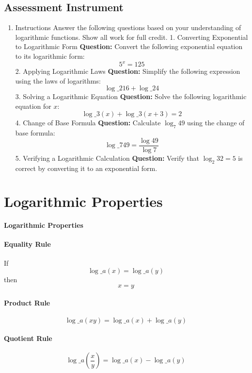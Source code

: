 \subsection{Assessment Instrument}

\begin{enumerate}
    \item Instructions Answer the following questions based on your understanding of logarithmic functions. Show all work for full credit. 1. Converting Exponential to Logarithmic Form \textbf{Question:} Convert the following exponential equation to its logarithmic form: $$ 5^x = 125 $$ 2. Applying Logarithmic Laws \textbf{Question:} Simplify the following expression using the laws of logarithms: $$ \log\_2 16 + \log\_2 4 $$ 3. Solving a Logarithmic Equation \textbf{Question:} Solve the following logarithmic equation for $x$: $$ \log\_3 (x) + \log\_3 (x + 3) = 2 $$ 4. Change of Base Formula \textbf{Question:} Calculate $\log_7 49$ using the change of base formula: $$ \log\_7 49 = \frac{\log 49}{\log 7} $$ 5. Verifying a Logarithmic Calculation \textbf{Question:} Verify that $\log_2 32 = 5$ is correct by converting it to an exponential form.
\end{enumerate}

\section{Logarithmic Properties}
\label{sec:logarithmic-properties}

\paragraph{Logarithmic Properties}

\paragraph{Equality Rule}

If 
$$
\log\_a(x) = \log\_a(y)
$$
then 
$$
x = y
$$
\paragraph{Product Rule}
$$
\log\_a(xy) = \log\_a(x) + \log\_a(y)
$$
\paragraph{Quotient Rule}
$$
\log\_a \left(\frac{x}{y}\right) = \log\_a(x) - \log\_a(y)
$$
